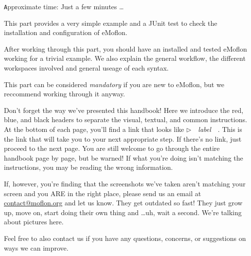 {\small \texttt Approximate time: Just a few minutes \ldots}

This part provides a very simple example and a JUnit test to check the installation and configuration of eMoflon.

After working through this part, you should have an installed and tested eMoflon working for a trivial example.
We also explain the general workflow, the different workspaces involved and general useage of each syntax.

This part can be considered \emph{mandatory} if you are new to eMoflon, but we reccommend working through it anyway.

Don't forget the way we've presented this handbook! Here we introduce the red, blue, and black headers to separate the visual, textual, and common instructions. At the bottom of each page, you'll find a link that looks like \mbox{$\triangleright$ { \textt \emph{label} } }. This is the link that will take you to your next appropriate step. If there's no link, just proceed to the next page. You are still welcome to go through the entire handbook page by page, but be warned! If what you're doing isn't matching the instructions, you may be reading the wrong information. 

If, however, you're finding that the screenshots we've taken aren't matching your screen and you ARE in the right place, please send us an email at \href{mailto:contact@moflon.org}{contact@moflon.org} and let us know. They get outdated so fast! They just grow up, move on, start doing their own thing and \ldots uh, wait a second. We're talking about pictures here.

Feel free to also contact us if you have any questions, concerns, or suggestions on ways we can improve.